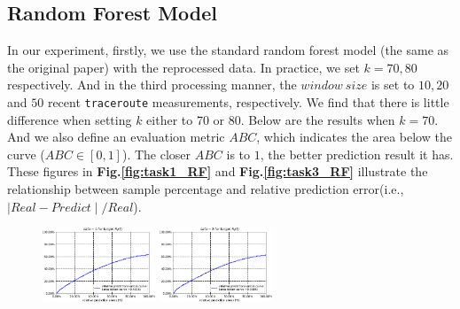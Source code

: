 \documentclass[sigconf]{acmart}
\begin{document}
	\subsection{Random Forest Model}
	In our experiment, firstly, we use the standard random forest model (the same as the original paper) with the reprocessed data.  In practice, we set $k = 70, 80$ respectively. And in the third processing manner, the $window\ size$ is set to $10,20$ and $50$ recent \texttt{traceroute} measurements, respectively. We find that there is little difference when setting $k$ either to 70 or 80. Below are the results when $k = 70$. And we also define an evaluation metric $ABC$, which indicates the  area below the curve ($ABC\in[0,1]$). The closer $ABC$ is to $1$, the better prediction result it has. These figures in \textbf{Fig.\ref{fig:task1_RF}} and \textbf{Fig.\ref{fig:task3_RF}} illustrate the relationship between sample percentage and relative prediction error(i.e., $\mid Real - Predict\mid/ Real $). 
	\begin{figure} [!htb] 
		\centering  
		\includegraphics[width=0.3\textwidth]{fig4/data-1-task-1-7030-RF.pdf}  
		\includegraphics[width=0.3\textwidth]{fig4/data-2-task-1-7030-RF.pdf} 
	\end{figure} 
\end{document}
